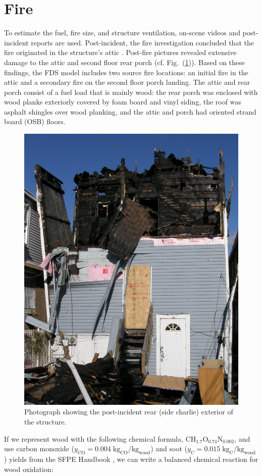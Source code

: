 \documentclass[11pt,oneside]{book}
\renewcommand{\C}{\mbox{C}}
\renewcommand{\H}{\mbox{H}}
\renewcommand{\O}{\mbox{O}}
\newcommand{\N}{\mbox{N}}
\begin{document}
\section{Fire}
\label{fire}

To estimate the fuel, fire size, and structure ventilation, on-scene videos and post-incident reports are used. Post-incident, the fire investigation concluded that the fire originated in the structure's attic \cite{NIOSH:Bowyer}. Post-fire pictures revealed extensive damage to the attic and second floor rear porch (cf. Fig.~(\ref{fig:charlie_ex})). Based on these findings, the FDS model includes two source fire locations: an initial fire in the attic and a secondary fire on the second floor porch landing. The attic and rear porch consist of a fuel load that is mainly wood: the rear porch was enclosed with wood planks exteriorly covered by foam board and vinyl siding, the roof was asphalt shingles over wood planking, and the attic and porch had oriented strand board (OSB) floors.  

\begin{figure}[h!]
\centering
\includegraphics[width=.65\textwidth]{../Figures/exterior_charlie}
\caption{Photograph showing the post-incident rear (side charlie) exterior of the structure.}
\label{fig:charlie_ex}
\end{figure}


If we represent wood with the following chemical formula, $\C\H_{1.7}\O_{0.74}\N_{0.002}$, and use carbon monoxide ($y_{\mathrm{CO}}=0.004 \; {\mathrm{kg_{CO}}/\mathrm{kg_{wood}}}$) and soot ($y_{\mathrm{C}}=0.015 \; {\mathrm{kg_{C}}/\mathrm{kg_{wood}}}$) yields from the SFPE Handbook \cite{SFPE:Tewarson}, we can write a balanced chemical reaction for wood oxidation:
\end{document}
